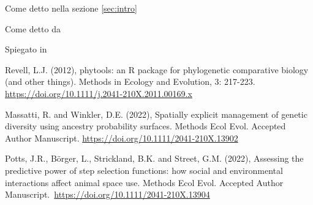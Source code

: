 \documentclass[a4paper,12pt]{article} %
\begin{document}
Come detto nella sezione \ref{sec:intro}

Come detto da \citep{Revell_2012, Potts_2022}

Spiegato in \citep{Massatti_2022}

\begin{thebibliography}{999}
Revell, L.J. (2012), phytools: an R package for phylogenetic comparative biology (and other things). Methods in Ecology and Evolution, 3: 217-223. \url{https://doi.org/10.1111/j.2041-210X.2011.00169.x}

Massatti, R. and Winkler, D.E. (2022), Spatially explicit management of genetic diversity using ancestry probability surfaces. Methods Ecol Evol. Accepted Author Manuscript. \url{https://doi.org/10.1111/2041-210X.13902}

Potts, J.R., Börger, L., Strickland, B.K. and Street, G.M. (2022), Assessing the predictive power of step selection functions: how social and environmental interactions affect animal space use. Methods Ecol Evol. Accepted Author Manuscript. \url{https://doi.org/10.1111/2041-210X.13904}

\end{thebibliography}
\end{document}
